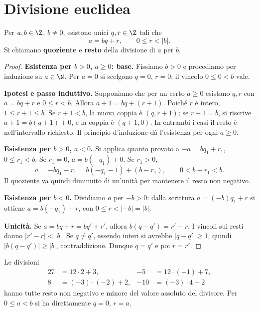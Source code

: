 \section{Divisione euclidea}
\begin{teorema}\label{teo:divisione}
Per $a,b\in\Z$, $b\ne0$, esistono unici $q,r\in\Z$ tali che
\[
a=bq+r,\qquad 0\le r<|b|.
\]
Si chiamano \textbf{quoziente} e \textbf{resto} della divisione di $a$ per $b$.
\end{teorema}
\begin{proof}
\textbf{Esistenza per $b>0$, $a\ge0$: base.} Fissiamo $b>0$ e procediamo per induzione su $a\in\N$. Per $a=0$ si scelgono $q=0$, $r=0$; il vincolo $0\le0<b$ vale.

\textbf{Ipotesi e passo induttivo.} Supponiamo che per un certo $a\ge0$ esistano $q,r$ con $a=bq+r$ e $0\le r<b$. Allora $a+1=bq+(r+1)$. Poiché $r$ è intero, $1\le r+1\le b$. Se $r+1<b$, la nuova coppia è $(q,r+1)$; se $r+1=b$, si riscrive $a+1=b(q+1)+0$, e la coppia è $(q+1,0)$. In entrambi i casi il resto è nell'intervallo richiesto. Il principio d'induzione dà l'esistenza per ogni $a\ge0$.

\textbf{Esistenza per $b>0$, $a<0$.} Si applica quanto provato a $-a=bq_1+r_1$, $0\le r_1<b$. Se $r_1=0$, $a=b(-q_1)+0$. Se $r_1>0$,
\[
a=-bq_1-r_1=b(-q_1-1)+(b-r_1),\qquad 0<b-r_1<b.
\]
Il quoziente va quindi diminuito di un'unità per mantenere il resto non negativo.

\textbf{Esistenza per $b<0$.} Dividiamo $a$ per $-b>0$: dalla scrittura $a=(-b)q_1+r$ si ottiene $a=b(-q_1)+r$, con $0\le r<|-b|=|b|$.

\textbf{Unicità.} Se $a=bq+r=bq'+r'$, allora $b(q-q')=r'-r$. I vincoli sui resti danno $|r'-r|<|b|$. Se $q\ne q'$, essendo interi si avrebbe $|q-q'|\ge1$, quindi $|b(q-q')|\ge|b|$, contraddizione. Dunque $q=q'$ e poi $r=r'$.
\end{proof}

\begin{esempio}
Le divisioni
\[
\begin{aligned}
27&=12\cdot2+3,&-5&=12\cdot(-1)+7,\\
8&=(-3)\cdot(-2)+2,&-10&=(-3)\cdot4+2
\end{aligned}
\]
hanno tutte resto non negativo e minore del valore assoluto del divisore. Per $0\le a<b$ si ha direttamente $q=0$, $r=a$.
\end{esempio}

